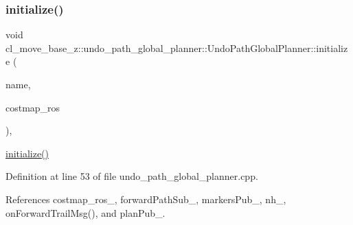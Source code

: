 \subsubsection{\texorpdfstring{initialize()}{initialize()}}
{\footnotesize\ttfamily void cl\+\_\+move\+\_\+base\+\_\+z\+::undo\+\_\+path\+\_\+global\+\_\+planner\+::\+Undo\+Path\+Global\+Planner\+::initialize (\begin{DoxyParamCaption}\item[{std\+::string}]{name,  }\item[{costmap\+\_\+2d\+::\+Costmap2\+D\+R\+OS $\ast$}]{costmap\+\_\+ros }\end{DoxyParamCaption})\hspace{0.3cm}{\ttfamily [override]}, {\ttfamily [virtual]}}

\hyperlink{classcl__move__base__z_1_1undo__path__global__planner_1_1UndoPathGlobalPlanner_a69e0fbb98872f108f679b2a6620638f5}{initialize()} 

Definition at line 53 of file undo\+\_\+path\+\_\+global\+\_\+planner.\+cpp.



References costmap\+\_\+ros\+\_\+, forward\+Path\+Sub\+\_\+, markers\+Pub\+\_\+, nh\+\_\+, on\+Forward\+Trail\+Msg(), and plan\+Pub\+\_\+.


